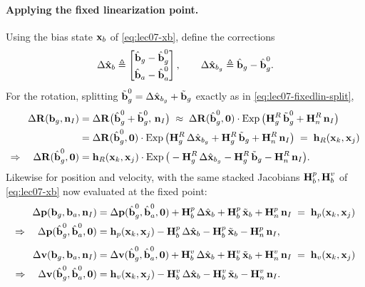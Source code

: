 \paragraph{Applying the fixed linearization point.} Using the bias state $\vect{x}_b$ of \eqref{eq:lec07-xb}, define the corrections
\begin{align}
\Delta\hat{\vect{x}}_b \triangleq \begin{bmatrix} \hat{\vect{b}}_g - \hat{\vect{b}}_g^0 \\[2pt] \hat{\vect{b}}_a - \hat{\vect{b}}_a^0 \end{bmatrix},
\qquad
\Delta\hat{\vect{x}}_{b_g} \triangleq \hat{\vect{b}}_g - \hat{\vect{b}}_g^0 .
\label{eq:lec07-dxb}
\end{align}
For the rotation, splitting $\tilde{\vect{b}}_g^0 = \Delta\hat{\vect{x}}_{b_g} + \tilde{\vect{b}}_g$ exactly as in \eqref{eq:lec07-fixedlin-split},
\begin{align}
\Delta\vect{R}(\vect{b}_g, \vect{n}_I)
&= \Delta\vect{R}\big(\hat{\vect{b}}_g^0 + \tilde{\vect{b}}_g^0,\, \vect{n}_I\big)
\;\approx\; \Delta\vect{R}(\hat{\vect{b}}_g^0, \vect{0})\cdot\Exp\big(\vect{H}_g^R\,\tilde{\vect{b}}_g^0 + \vect{H}_n^R\,\vect{n}_I\big) \notag \\
&= \Delta\vect{R}(\hat{\vect{b}}_g^0, \vect{0})\cdot\Exp\big(\vect{H}_g^R\,\Delta\hat{\vect{x}}_{b_g} + \vect{H}_g^R\,\tilde{\vect{b}}_g + \vect{H}_n^R\,\vect{n}_I\big)
\;=\; \vect{h}_R(\vect{x}_k, \vect{x}_j) \notag \\
\Rightarrow\quad
\Delta\vect{R}(\hat{\vect{b}}_g^0, \vect{0})
&= \vect{h}_R(\vect{x}_k, \vect{x}_j)\cdot\Exp\big(-\vect{H}_g^R\,\Delta\hat{\vect{x}}_{b_g} - \vect{H}_g^R\,\tilde{\vect{b}}_g - \vect{H}_n^R\,\vect{n}_I\big).
\end{align}
Likewise for position and velocity, with the same stacked Jacobians $\vect{H}_b^p, \vect{H}_b^v$ of \eqref{eq:lec07-xb} now evaluated at the fixed point:
\begin{align}
\Delta\vect{p}(\vect{b}_g, \vect{b}_a, \vect{n}_I)
&= \Delta\vect{p}(\hat{\vect{b}}_g^0, \hat{\vect{b}}_a^0, \vect{0})
+ \vect{H}_b^p\,\Delta\hat{\vect{x}}_b + \vect{H}_b^p\,\tilde{\vect{x}}_b + \vect{H}_n^p\,\vect{n}_I
\;=\; \vect{h}_p(\vect{x}_k, \vect{x}_j) \notag \\
\Rightarrow\quad
\Delta\vect{p}(\hat{\vect{b}}_g^0, \hat{\vect{b}}_a^0, \vect{0})
&= \vect{h}_p(\vect{x}_k, \vect{x}_j) - \vect{H}_b^p\,\Delta\hat{\vect{x}}_b - \vect{H}_b^p\,\tilde{\vect{x}}_b - \vect{H}_n^p\,\vect{n}_I, \\[4pt]
\Delta\vect{v}(\vect{b}_g, \vect{b}_a, \vect{n}_I)
&= \Delta\vect{v}(\hat{\vect{b}}_g^0, \hat{\vect{b}}_a^0, \vect{0})
+ \vect{H}_b^v\,\Delta\hat{\vect{x}}_b + \vect{H}_b^v\,\tilde{\vect{x}}_b + \vect{H}_n^v\,\vect{n}_I
\;=\; \vect{h}_v(\vect{x}_k, \vect{x}_j) \notag \\
\Rightarrow\quad
\Delta\vect{v}(\hat{\vect{b}}_g^0, \hat{\vect{b}}_a^0, \vect{0})
&= \vect{h}_v(\vect{x}_k, \vect{x}_j) - \vect{H}_b^v\,\Delta\hat{\vect{x}}_b - \vect{H}_b^v\,\tilde{\vect{x}}_b - \vect{H}_n^v\,\vect{n}_I.
\end{align}

